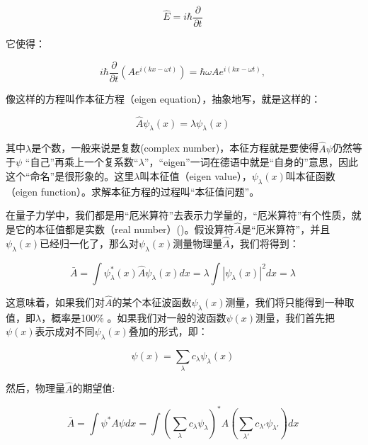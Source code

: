 \begin{equation}
    \hat E = i \hbar \frac{\partial }{\partial t}~
\end{equation}

它使得：

\begin{equation}
i \hbar \frac{\partial }{\partial t} \left( A e^{i (kx-\omega t)} \right)= \hbar \omega A e^{i (kx-\omega t)} ,~
\end{equation}

像这样的方程叫作本征方程（eigen equation），抽象地写，就是这样的：

\begin{equation}
\hat A \psi_{\lambda}(x) = \lambda \psi_{\lambda}(x)~
\end{equation}

其中$\lambda$是个数，一般来说是复数(complex number)，本征方程就是要使得$\hat A \psi$仍然等于$\psi$ “自己”再乘上一个复系数“$\lambda$”，“eigen”一词在德语中就是“自身的”意思，因此这个“命名”是很形象的。这里$\lambda$叫本征值（eigen value），$\psi_{\lambda}(x)$叫本征函数（eigen function）。求解本征方程的过程叫“本征值问题”。

在量子力学中，我们都是用“厄米算符”去表示力学量的，“厄米算符”有个性质，就是它的本征值都是实数（real number）()。假设算符$\hat A$是“厄米算符”，并且$\psi_{\lambda}(x)$已经归一化了，那么对$\psi_{\lambda}(x)$测量物理量$\hat A$，我们将得到：

\begin{equation}
\bar A = \int \psi_{\lambda}^*(x) \hat A \psi_{\lambda}(x) dx =
\lambda \int |\psi_{\lambda}(x)|^2 dx = \lambda~
\end{equation}

这意味着，如果我们对$\hat A$的某个本征波函数$\psi_{\lambda}(x)$测量，我们将只能得到一种取值，即$\lambda$，概率是100\% 。如果我们对一般的波函数$\psi(x)$测量，我们首先把$\psi(x)$表示成对不同$\psi_{\lambda}(x)$叠加的形式，即：

\begin{equation}
\psi(x) = \sum\limits_{\lambda} c_{\lambda} \psi_{\lambda}(x)~
\end{equation}

然后，物理量$\hat A$的期望值:

\begin{equation}
\bar A = \int \psi^* A \psi dx = \int \left( \sum\limits_{\lambda}
c_{\lambda} \psi_{\lambda} \right)^* A \left( \sum\limits_{\lambda'}
c_{\lambda'} \psi_{\lambda'} \right) dx~
\end{equation}

